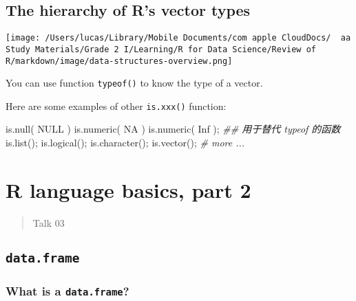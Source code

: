 \documentclass[
]{article}
\let\oldincludegraphics\includegraphics
\renewcommand{\includegraphics}[2][]{\begin{center}\oldincludegraphics[#1]{#2}\end{center}}
\newenvironment{Shaded}{}{}
\newcommand{\CommentTok}[1]{\textcolor[rgb]{0.38,0.63,0.69}{\textit{#1}}}
\newcommand{\ConstantTok}[1]{\textcolor[rgb]{0.53,0.00,0.00}{#1}}
\newcommand{\DocumentationTok}[1]{\textcolor[rgb]{0.73,0.13,0.13}{\textit{#1}}}
\newcommand{\FunctionTok}[1]{\textcolor[rgb]{0.02,0.16,0.49}{#1}}
\newcommand{\NormalTok}[1]{#1}
\begin{document}
\hypertarget{the-hierarchy-of-rs-vector-types}{%
\subsection{The hierarchy of R's vector
types}\label{the-hierarchy-of-rs-vector-types}}

\texttt{[image: /Users/lucas/Library/Mobile Documents/com~apple~CloudDocs/~~aa Study Materials/Grade 2 I/Learning/R for Data Science/Review of R/markdown/image/data-structures-overview.png]}

You can use function \texttt{typeof()} to know the type of a vector.

Here are some examples of other \texttt{is.xxx()} function:

\begin{Shaded}
\begin{Highlighting}[]
\FunctionTok{is.null}\NormalTok{( }\ConstantTok{NULL}\NormalTok{ )}
\FunctionTok{is.numeric}\NormalTok{( }\ConstantTok{NA}\NormalTok{ )}
\FunctionTok{is.numeric}\NormalTok{( }\ConstantTok{Inf}\NormalTok{ );}
\DocumentationTok{\#\# 用于替代 typeof 的函数}
\FunctionTok{is.list}\NormalTok{();}
\FunctionTok{is.logical}\NormalTok{();}
\FunctionTok{is.character}\NormalTok{();}
\FunctionTok{is.vector}\NormalTok{();}
\CommentTok{\# more ...}
\end{Highlighting}
\end{Shaded}

\hypertarget{r-language-basics-part-2}{%
\section{R language basics, part 2}\label{r-language-basics-part-2}}

\begin{quote}
Talk 03
\end{quote}

\hypertarget{dataframe}{%
\subsection{\texorpdfstring{\texttt{data.frame}}{data.frame}}\label{dataframe}}

\hypertarget{what-is-a-dataframe}{%
\subsubsection{\texorpdfstring{\textbf{What is a
\texttt{data.frame}?}}{What is a data.frame?}}\label{what-is-a-dataframe}}
\end{document}
